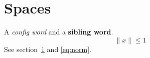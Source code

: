 \documentclass{article}
\newcommand\term[1]{\emph{#1}}
\newcommand\keyword[1]{\textbf{#1}}
\newcommand\norm[1]{\lVert #1\rVert}
\begin{document}
\section{Spaces}\label{sec:spaces}
A \term{config word} and a \keyword{sibling word}.
\begin{equation}\label{eq:norm}
  \norm{x} \le 1
\end{equation}
See section~\ref{sec:spaces} and \eqref{eq:norm}.
\end{document}
